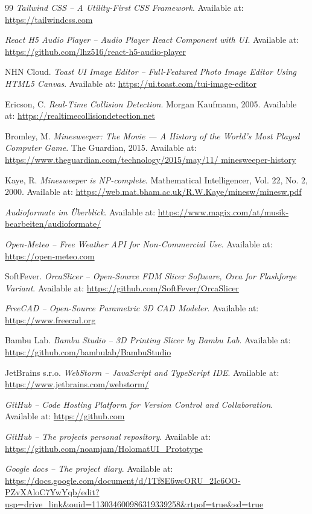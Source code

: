 \documentclass[a4paper,12pt]{article}
\begin{document}
\begin{thebibliography}{99}
\textit{Tailwind CSS -- A Utility-First CSS Framework}.
Available at: \url{https://tailwindcss.com}

\textit{React H5 Audio Player -- Audio Player React Component with UI}.
Available at: \url{https://github.com/lhz516/react-h5-audio-player}

NHN Cloud.
\textit{Toast UI Image Editor -- Full-Featured Photo Image Editor Using HTML5 Canvas}.
Available at: \url{https://ui.toast.com/tui-image-editor}

Ericson, C.
\textit{Real-Time Collision Detection}.
Morgan Kaufmann, 2005.
Available at: \url{https://realtimecollisiondetection.net}

Bromley, M.
\textit{Minesweeper: The Movie — A History of the World's Most Played 
Computer Game}.
The Guardian, 2015.
Available at: \url{https://www.theguardian.com/technology/2015/may/11/
minesweeper-history}

Kaye, R.
\textit{Minesweeper is NP-complete}.
Mathematical Intelligencer, Vol. 22, No. 2, 2000.
Available at: \url{https://web.mat.bham.ac.uk/R.W.Kaye/minesw/minesw.pdf}

\textit{Audioformate im Überblick}.
Available at: \url{https://www.magix.com/at/musik-bearbeiten/audioformate/}

\textit{Open-Meteo -- Free Weather API for Non-Commercial Use}.
Available at: \url{https://open-meteo.com}

SoftFever.
\textit{OrcaSlicer -- Open-Source FDM Slicer Software, Orca for Flashforge Variant}.
Available at: \url{https://github.com/SoftFever/OrcaSlicer}

\textit{FreeCAD -- Open-Source Parametric 3D CAD Modeler}.
Available at: \url{https://www.freecad.org}

Bambu Lab.
\textit{Bambu Studio -- 3D Printing Slicer by Bambu Lab}.
Available at: \url{https://github.com/bambulab/BambuStudio}

JetBrains s.r.o.
\textit{WebStorm -- JavaScript and TypeScript IDE}.
Available at: \url{https://www.jetbrains.com/webstorm/}

\textit{GitHub -- Code Hosting Platform for Version Control and Collaboration}.
Available at: \url{https://github.com}

\textit{GitHub -- The projects personal repository}.
Available at: \url{https://github.com/noamjam/HolomatUI_Prototype}

\textit{Google docs -- The project diary}.
Available at: \url{https://docs.google.com/document/d/1Tf8E6wcORU_2Ic6OO-PZvXAloC7YwYqb/edit?usp=drive_link&ouid=113034600986319339258&rtpof=true&sd=true}


\end{thebibliography}
\end{document}

